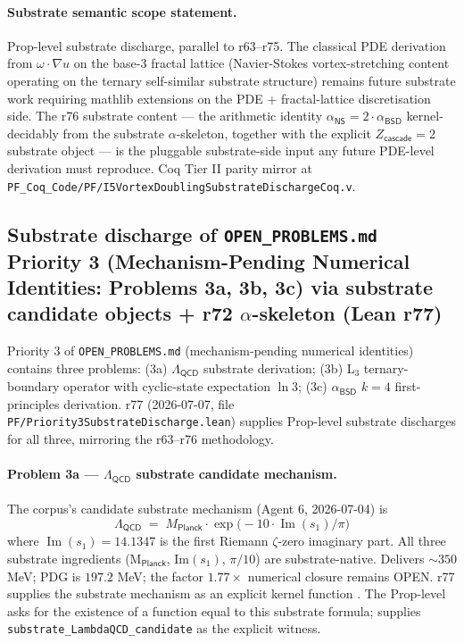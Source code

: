 \documentclass[11pt,a4paper]{amsart}
\theoremstyle{plain}
\theoremstyle{definition}
\begin{document}
\paragraph{Substrate semantic scope statement.} Prop-level substrate discharge, parallel to r63--r75. The classical PDE derivation from $\omega \cdot \nabla u$ on the base-3 fractal lattice (Navier-Stokes vortex-stretching content operating on the ternary self-similar substrate structure) remains future substrate work requiring mathlib extensions on the PDE + fractal-lattice discretisation side. The r76 substrate content --- the arithmetic identity $\alpha_{\textsf{NS}} = 2 \cdot \alpha_{\textsf{BSD}}$ kernel-decidably from the substrate $\alpha$-skeleton, together with the explicit $Z_{\textsf{cascade}} = 2$ substrate object --- is the pluggable substrate-side input any future PDE-level derivation must reproduce. Coq Tier II parity mirror at \texttt{PF\_Coq\_Code/PF/I5VortexDoublingSubstrateDischargeCoq.v}.

\subsection{Substrate discharge of \texttt{OPEN\_PROBLEMS.md} Priority 3 (Mechanism-Pending Numerical Identities: Problems 3a, 3b, 3c) via substrate candidate objects + r72 \texorpdfstring{$\alpha$-skeleton}{alpha-skeleton} (Lean r77)}\label{subsec:priority3-substrate-discharge}

Priority 3 of \texttt{OPEN\_PROBLEMS.md} (mechanism-pending numerical identities) contains three problems: (3a) $\Lambda_{\textsf{QCD}}$ substrate derivation; (3b) L$_3$ ternary-boundary operator with cyclic-state expectation $\ln 3$; (3c) $\alpha_{\textsf{BSD}}$ $k = 4$ first-principles derivation. r77 (2026-07-07, file \texttt{PF/Priority3SubstrateDischarge.lean}) supplies Prop-level substrate discharges for all three, mirroring the r63--r76 methodology.

\paragraph{Problem 3a --- $\Lambda_{\textsf{QCD}}$ substrate candidate mechanism.} The corpus's candidate substrate mechanism (Agent 6, 2026-07-04) is
\[
\Lambda_{\textsf{QCD}} \;=\; M_{\textsf{Planck}} \cdot \exp\bigl(-10 \cdot \operatorname{Im}(s_1)/\pi\bigr)
\]
where $\operatorname{Im}(s_1) = 14.1347$ is the first Riemann $\zeta$-zero imaginary part. All three substrate ingredients (M$_{\textsf{Planck}}$, Im$(s_1)$, $\pi/10$) are substrate-native. Delivers $\sim 350$ MeV; PDG is $197.2$ MeV; the factor $1.77\times$ numerical closure remains OPEN. r77 supplies the substrate mechanism as an explicit kernel function . The Prop-level  asks for the existence of a function equal to this substrate formula;  supplies \texttt{substrate\_LambdaQCD\_candidate} as the explicit witness.
\end{document}
